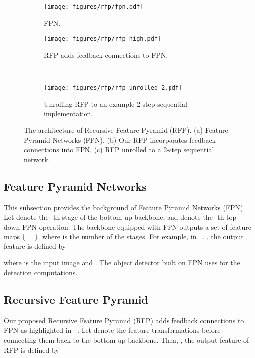\documentclass[final]{cvpr}
\begin{document}
\begin{figure*}
    \centering
    \begin{subfigure}[t]{0.45\textwidth}
         \centering
         \texttt{[image: figures/rfp/fpn.pdf]}
         \caption{FPN.}
         \label{fig:fpn}
     \end{subfigure}
     \hfill
     \begin{subfigure}[t]{0.45\textwidth}
         \centering
         \texttt{[image: figures/rfp/rfp\_high.pdf]}
         \caption{RFP adds feedback connections to FPN.}
         \label{fig:rfp}
     \end{subfigure}\\
     \begin{subfigure}[t]{0.8\textwidth}
         \centering
         \texttt{[image: figures/rfp/rfp\_unrolled\_2.pdf]}
         \caption{Unrolling RFP to an example 2-step sequential implementation.}
         \label{fig:rfp_unrolled}
     \end{subfigure}
     \caption{The architecture of Recursive Feature Pyramid (RFP). (a) Feature Pyramid Networks (FPN). (b) Our RFP incorporates feedback connections into FPN. (c) RFP unrolled to a 2-step sequential network.
     }
     \label{fig:rfp_overview}
\end{figure*}

\subsection{Feature Pyramid Networks}
This subsection provides the background of Feature Pyramid Networks (FPN).
Let  denote the -th stage of the bottom-up backbone, and  denote the -th top-down FPN operation. The backbone equipped with FPN outputs a set of feature maps \{~|~\}, where  is the number of the stages.
For example,  in ~.
, the output feature  is defined by

where  is the input image and .
The object detector built on FPN uses  for the detection computations.

\subsection{Recursive Feature Pyramid}

Our proposed Recursive Feature Pyramid (RFP) adds feedback connections to FPN as highlighted in ~.
Let  denote the feature transformations before connecting them back to the bottom-up backbone.
Then, , the output feature  of RFP is defined by
\end{document}
